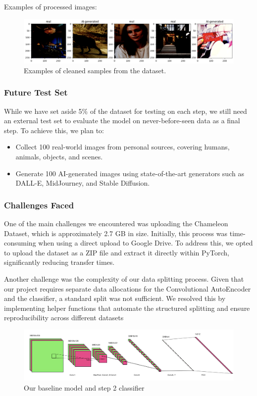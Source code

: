 \documentclass{article} %
\begin{document}
Examples of processed images:
\begin{figure}[h]
    \centering
    \includegraphics[width=1\textwidth]{figs/data_examples.png}
    \caption{Examples of cleaned samples from the dataset.}
    \label{fig:cleaned_sample}
\end{figure}

\subsubsection{Future Test Set}
While we have set aside 5\% of the dataset for testing on each step, we still need an external test set to evaluate the model on never-before-seen data as a final step. To achieve this, we plan to:

\begin{itemize}
    \item Collect 100 real-world images from personal sources, covering humans, animals, objects, and scenes.
    \item Generate 100 AI-generated images using state-of-the-art generators such as DALL-E, MidJourney, and Stable Diffusion.
\end{itemize}

\subsubsection{Challenges Faced}
One of the main challenges we encountered was uploading the Chameleon Dataset, which is approximately 2.7 GB in size. Initially, this process was time-consuming when using a direct upload to Google Drive. To address this, we opted to upload the dataset as a ZIP file and extract it directly within PyTorch, significantly reducing transfer times.

Another challenge was the complexity of our data splitting process. Given that our project requires separate data allocations for the Convolutional AutoEncoder and the classifier, a standard split was not sufficient. We resolved this by implementing helper functions that automate the structured splitting and ensure reproducibility across different datasets

\begin{figure}[h]
    \centering
    \includegraphics[width=1\textwidth]{figs/baseline.png}
    \caption{Our baseline model and step 2 classifier}
    \label{fig: baseline}
\end{figure}
\end{document}
